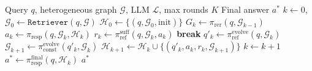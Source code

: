 \begin{algorithm}[t]
\caption{ToG-3: Multi-Agent Context Evolution and Retrieval (MACER) Loop}
\label{alg:tog3-full}
\begin{algorithmic}[1]
\Require Query $q$, heterogeneous graph $\mathcal{G}$, LLM $\mathcal{L}$, max rounds $K$
\Ensure Final answer $a^*$
\State $k \gets 0$, $\mathcal{G}_0 \gets \texttt{Retriever}(q, \mathcal{G})$ 
\State $\mathcal{H}_0 \gets \{(q, \mathcal{G}_0, \text{init})\}$ 
\Repeat
    \State $G_k \gets \pi_{\text{rer}}(q, \mathcal{G}_{k-1})$  \label{line:rerank}
    \State $a_k \gets \pi_{\text{resp}}(q, \mathcal{G}_k, \mathcal{H}_k)$  \label{line:response}
    \State $r_k \gets \pi_{\text{ref}}^{\text{suff}}(q, \mathcal{G}_k, a_k)$  \label{line:suff}
     \textbf{break} \EndIf
    \State $q'_k \gets \pi_{\text{ref}}^{\text{evolve}}(q, \mathcal{G}_k)$ 
    \State $\mathcal{G}_{k+1} \gets \pi_{\text{const}}^{{\text{evolve}}}(q'_k, \mathcal{G}_k)$  \label{line:refine}
    \State $\mathcal{H}_{k+1} \gets \mathcal{H}_k \cup \{(q'_k, a_k, r_k, \mathcal{G}_{k+1})\}$
    \State $k \gets k + 1$
\State $a^* \gets \pi_{\text{resp}}^{\text{final}}(q, \mathcal{H}_k)$ 
\State \Return $a^*$
\end{algorithmic}
\end{algorithm}